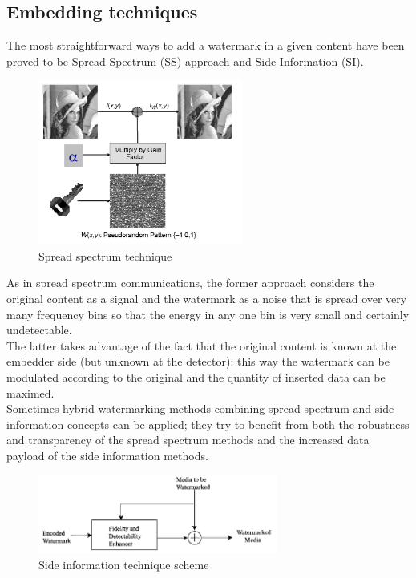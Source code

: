\subsection{Embedding techniques}
The most straightforward ways to add a watermark in a given content have been proved to be Spread Spectrum (SS) approach and Side Information (SI).\\
\begin{figure}[h!]
\centering
\includegraphics[width=0.6\textwidth]{./img/ss.png}
\caption{\small{Spread spectrum technique}}
\label{fig:ss}
\end{figure}
As in spread spectrum communications, the former approach considers the original
content as a signal and the watermark as a noise that is spread over very many frequency bins so that the energy in any one bin is very small and certainly undetectable.\\
The latter takes advantage of the fact that the original content is known at the
embedder side (but unknown at the detector): this way the watermark can be modulated  according to the original and the quantity of
inserted data can be maximed.\\

Sometimes hybrid watermarking methods combining spread spectrum and side information concepts can be applied; they try to benefit from both the robustness and transparency of the spread
spectrum methods and the increased data payload of the side information methods.
\begin{figure}[h!]
\centering
\includegraphics[width=0.7\textwidth]{./img/si.png}
\caption{\small{Side information technique scheme}}
\label{fig:si}
\end{figure}

